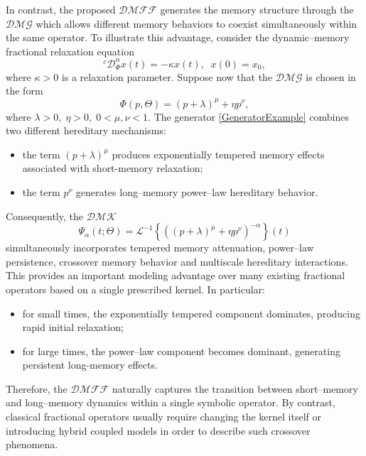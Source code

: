 \documentclass[11pt]{article}
\numberwithin{equation}{section}
\begin{document}
In contrast, the proposed $\mathcal{DMFF}$ generates the memory structure through the $\mathcal{DMG}$
which allows different memory behaviors to coexist simultaneously within the same operator.
To illustrate this advantage, consider the dynamic--memory fractional relaxation equation
\begin{equation}\label{Relax}
{}^{c}\mathcal D_{\Phi}^{\alpha}x(t)
=
-\kappa x(t),
\;\;
x(0)=x_{0},
\end{equation}
where \(\kappa>0\) is a relaxation parameter.
Suppose now that the $\mathcal{DMG}$ is chosen in the form
\begin{equation}\label{GeneratorExample}
\Phi(p,\Theta)
=
(p+\lambda)^{\mu}
+
\eta p^{\nu},
\end{equation}
where
\(
\lambda>0,
\;
\eta>0,
\;
0<\mu,\nu<1.
\)
The generator \eqref{GeneratorExample} combines two different hereditary mechanisms:
\begin{itemize}[itemsep=2pt,topsep=2pt]

\item
the term
\(
(p+\lambda)^{\mu}
\)
produces exponentially tempered memory effects associated with short-memory relaxation;

\item
the term
\(
p^{\nu}
\)
generates long--memory power--law hereditary behavior.

\end{itemize}
Consequently, the $\mathcal{DMK}$
\[
\Psi_{\alpha}(t;\Theta)
=
\mathcal L^{-1}
\left\{
\left(
(p+\lambda)^{\mu}
+
\eta p^{\nu}
\right)^{-\alpha}
\right\}(t)
\]
simultaneously incorporates
tempered memory attenuation,
power--law persistence,
crossover memory behavior and
multiscale hereditary interactions.
This provides an important modeling advantage over many existing fractional operators based on a single prescribed kernel.
In particular:
\begin{itemize}[itemsep=2pt,topsep=2pt]

\item
for small times, the exponentially tempered component dominates, producing rapid initial relaxation;

\item
for large times, the power--law component becomes dominant, generating persistent long-memory effects.

\end{itemize}
Therefore, the $\mathcal{DMFF}$ naturally captures the transition between short--memory and long--memory dynamics within a single symbolic operator.
By contrast, classical fractional operators usually require changing the kernel itself or introducing hybrid coupled models in order to describe such crossover phenomena.
\end{document}
